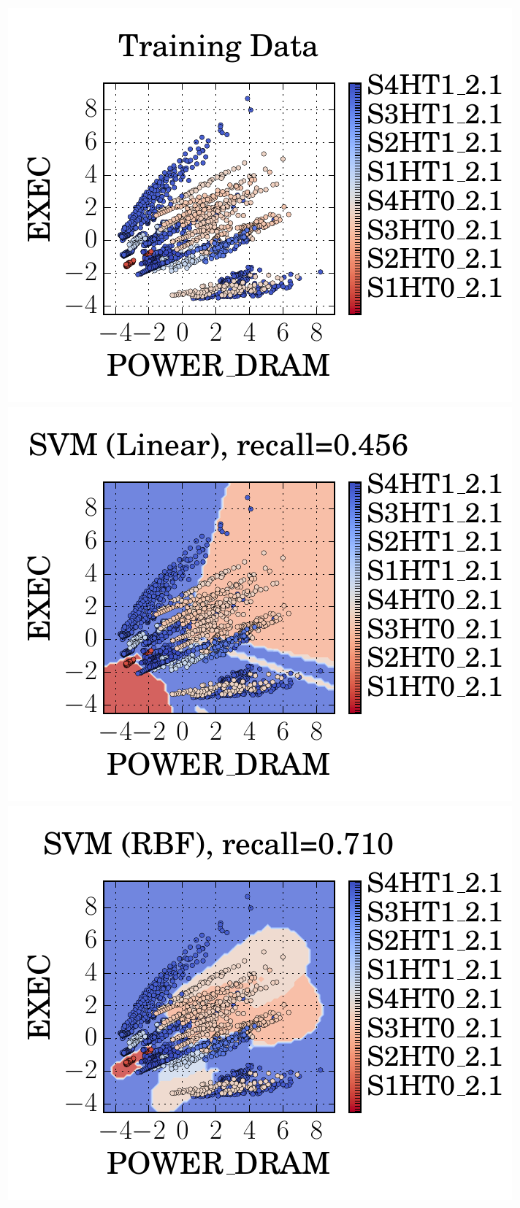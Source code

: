 \documentclass[a0,portrait]{a0poster}
\newcommand{\PAD}{\vskip 0.75cm}
\begin{document}
\begin{multicols}{2}
{
\PAD
  \centering
  \includegraphics[]{figures/training_space_noclassifier.pdf}
  \includegraphics[]{figures/training_space_svm_kern_lin.pdf}
  \includegraphics[]{figures/training_space_svm.pdf}
  \label{fig:classifier-training}
\PAD
}


\end{multicols}
\end{document}
